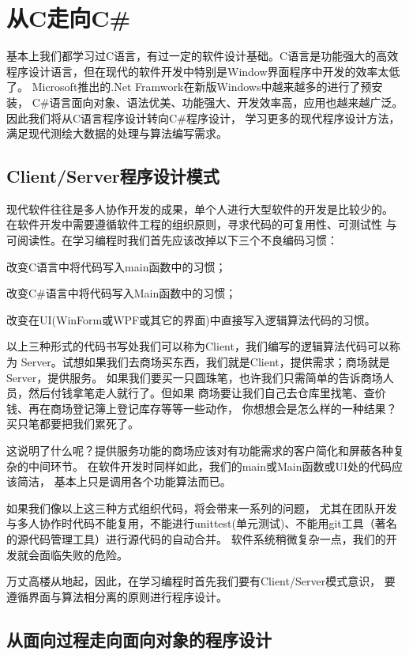 ﻿%

\chapter{从C走向C\#}

基本上我们都学习过C语言，有过一定的软件设计基础。C语言是功能强大的高效
程序设计语言，但在现代的软件开发中特别是Window界面程序中开发的效率太低了。
Microsoft推出的.Net Framwork在新版Windows中越来越多的进行了预安装，
C\#语言面向对象、语法优美、功能强大、开发效率高，应用也越来越广泛。
因此我们将从C语言程序设计转向C\#程序设计，
学习更多的现代程序设计方法，满足现代测绘大数据的处理与算法编写需求。

\section{Client/Server程序设计模式}
现代软件往往是多人协作开发的成果，单个人进行大型软件的开发是比较少的。
在软件开发中需要遵循软件工程的组织原则，寻求代码的可复用性、可测试性
与可阅读性。在学习编程时我们首先应该改掉以下三个不良编码习惯：

改变C语言中将代码写入main函数中的习惯；

改变C\#语言中将代码写入Main函数中的习惯；

改变在UI(WinForm或WPF或其它的界面)中直接写入逻辑算法代码的习惯。

以上三种形式的代码书写处我们可以称为Client，我们编写的逻辑算法代码可以称为
Server。试想如果我们去商场买东西，我们就是Client，提供需求；商场就是Server，提供服务。
如果我们要买一只圆珠笔，也许我们只需简单的告诉商场人员，然后付钱拿笔走人就行了。但如果
商场要让我们自己去仓库里找笔、查价钱、再在商场登记簿上登记库存等等一些动作，
你想想会是怎么样的一种结果？买只笔都要把我们累死了。

这说明了什么呢？提供服务功能的商场应该对有功能需求的客户简化和屏蔽各种复杂的中间环节。
在软件开发时同样如此，我们的main或Main函数或UI处的代码应该简洁，
基本上只是调用各个功能算法而已。

如果我们像以上这三种方式组织代码，将会带来一系列的问题，
尤其在团队开发与多人协作时代码不能复用，不能进行unittest(单元测试)、不能用git工具（著名的源代码管理工具）进行源代码的自动合并。
软件系统稍微复杂一点，我们的开发就会面临失败的危险。

万丈高楼从地起，因此，在学习编程时首先我们要有Client/Server模式意识，
要遵循界面与算法相分离的原则进行程序设计。

\section{从面向过程走向面向对象的程序设计 }


